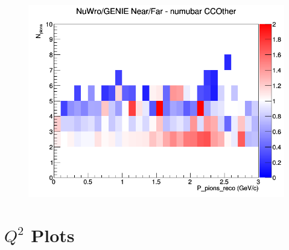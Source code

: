 \documentclass[12pt]{article}
\begin{document}
\begin{figure}[h]
\endminipage
{}
\includegraphics[width=\linewidth]{eff_N_P/GAr/pions/ratios/CCOther_NuWro_GENIE_numubar_NF_N_P.png}
\endminipage
\newline
\end{figure}
\clearpage

\newpage
\section{$Q^2$ Plots}
\end{document}
